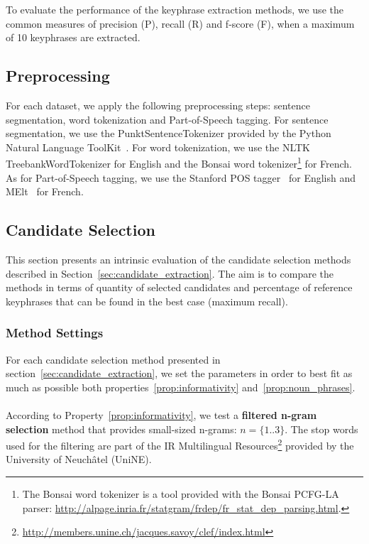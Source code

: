     To evaluate the performance of the keyphrase extraction methods, we use
    the common measures of precision (P), recall (R) and f-score (F), when a
    maximum of 10 keyphrases are extracted.

  \subsection{Preprocessing}
  \label{subsec:preprocessing}
    For each dataset, we apply the following preprocessing steps: sentence
    segmentation, word tokenization and Part-of-Speech tagging. For sentence
    segmentation, we use the PunktSentenceTokenizer provided by the Python
    Natural Language ToolKit~\cite[NLTK]{bird2009nltk}. For word tokenization,
    we use the NLTK TreebankWordTokenizer for English and the Bonsai word
    tokenizer\footnote{The Bonsai word tokenizer is a tool provided with the
    Bonsai PCFG-LA parser:
    \url{http://alpage.inria.fr/statgram/frdep/fr_stat_dep_parsing.html}.} for
    French. As for Part-of-Speech tagging, we use the Stanford
    POS tagger~\cite{toutanova2003stanfordpostagger} for English and
    MElt~\cite{denis2009melt} for French.

  \subsection{Candidate Selection}
  \label{subsec:candidate_extraction}

    This section presents an intrinsic evaluation of the candidate selection
    methods described in Section~\ref{sec:candidate_extraction}. The aim is to
    compare the methods in terms of quantity of selected candidates and
    percentage of reference keyphrases that can be found in the best case
    (maximum recall).

    \subsubsection{Method Settings}
    \label{subsubsec:method_settings}
      For each candidate selection method presented in
      section~\ref{sec:candidate_extraction}, we set the parameters in order to
      best fit as much as possible both properties~\ref{prop:informativity}
      and~\ref{prop:noun_phrases}.

      \paragraph{}
      According to Property~\ref{prop:informativity}, we test a \textbf{filtered
      n-gram selection} method that provides small-sized n-grams:
      $n = \{1..3\}$. The stop words used for the filtering are part of the IR
      Multilingual
      Resources\footnote{\url{http://members.unine.ch/jacques.savoy/clef/index.html}}
      provided by the University of Neuchâtel (UniNE).

